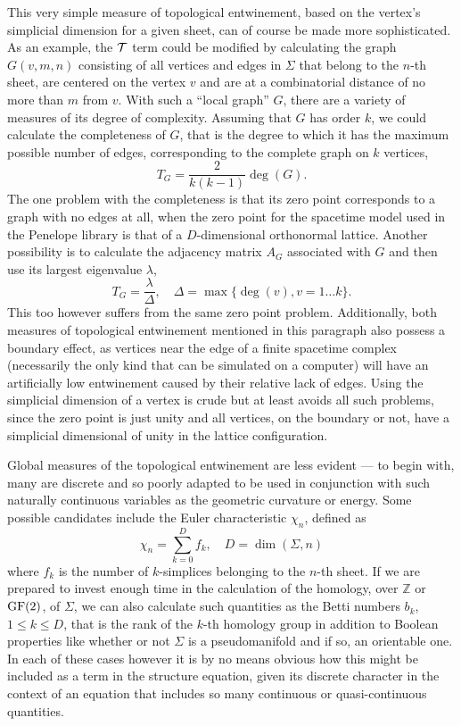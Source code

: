 \documentclass[12pt,letterpaper]{report}
\begin{document}
This very simple measure of topological entwinement, based on the vertex's simplicial dimension 
for a given sheet, can of course be made more sophisticated. As an example, the $\cal{T}$ term 
could be modified by calculating the graph $G(v,m,n)$ consisting of all vertices and edges in 
$\Sigma$ that belong to the $n$-th sheet, are centered on the vertex $v$ and are at a combinatorial 
distance of no more than $m$ from $v$. With such a ``local graph'' $G$, there are a variety of measures 
of its degree of complexity. Assuming that $G$ has order $k$, we could calculate the completeness of 
$G$, that is the degree to which it has the maximum possible number of edges, corresponding to the 
complete graph on $k$ vertices,
\begin{equation*}
T_G = \frac {2}{k(k-1)}\deg(G).
\end{equation*}
The one problem with the completeness is that its zero point corresponds to a graph with no edges at 
all, when the zero point for the spacetime model used in the Penelope library is that of a $D$-dimensional 
orthonormal lattice. Another possibility is to calculate the adjacency matrix $A_G$ associated with $G$ and 
then use its largest eigenvalue $\lambda$,
\begin{equation*}
T_G = \frac {\lambda}{\Delta}, \quad \Delta = \max \{\deg(v), v=1\dots k\}.
\end{equation*}
This too however suffers from the same zero point problem. Additionally, both measures of topological 
entwinement mentioned in this paragraph also possess a boundary effect, as vertices near the edge of a 
finite spacetime complex (necessarily the only kind that can be simulated on a computer) will have an 
artificially low entwinement caused by their relative lack of edges. Using the simplicial dimension of a 
vertex is crude but at least avoids all such problems, since the zero point is just unity and all vertices, 
on the boundary or not, have a simplicial dimensional of unity in the lattice configuration.       

Global measures of the topological entwinement are less evident --- to begin with, many are discrete and so 
poorly adapted to be used in conjunction with such naturally continuous variables as the geometric 
curvature or energy. Some possible candidates include the Euler characteristic $\chi_n$, defined as 
\begin{equation*}
\chi_n = \sum_{k=0}^D f_k, \quad D = \dim(\Sigma,n) 
\end{equation*}
where $f_k$ is the number of $k$-simplices belonging to the $n$-th sheet. If we are prepared to invest 
enough time in the calculation of the homology, over $\mathbb{Z}$ or $\textnormal{GF}(2)$, of $\Sigma$, 
we can also calculate such quantities as the Betti numbers $b_k$, $1\le k\le D$, that is the rank of the 
$k$-th homology group in addition to Boolean properties like whether or not $\Sigma$ is a pseudomanifold 
and if so, an orientable one. In each of these cases however it is by no means obvious how this might be 
included as a term in the structure equation, given its discrete character in the context of an equation 
that includes so many continuous or quasi-continuous quantities.    
  
\end{document}
